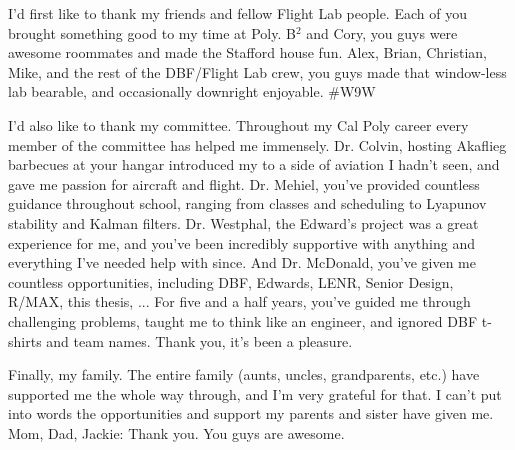I'd first like to thank my friends and fellow Flight Lab people. Each of you brought something good to my time at Poly. B$^2$ and Cory, you guys were awesome roommates and made the Stafford house fun. Alex, Brian, Christian, Mike, and the rest of the DBF/Flight Lab crew, you guys made that window-less lab bearable, and occasionally downright enjoyable. \#W9W

I'd also like to thank my committee. Throughout my Cal Poly career every member of the committee has helped me immensely. Dr. Colvin, hosting Akaflieg barbecues at your hangar introduced my to a side of aviation I hadn't seen, and gave me passion for aircraft and flight. Dr. Mehiel, you've provided countless guidance throughout school, ranging from classes and scheduling to Lyapunov stability and Kalman filters. Dr. Westphal, the Edward's project was a great experience for me, and you've been incredibly supportive with anything and everything I've needed help with since. And Dr. McDonald, you've given me countless opportunities, including DBF, Edwards, LENR, Senior Design, R/MAX, this thesis, ... For five and a half years, you've guided me through challenging problems, taught me to think like an engineer, and ignored DBF t-shirts and team names. Thank you, it's been a pleasure.

Finally, my family. The entire family (aunts, uncles, grandparents, etc.) have supported me the whole way through, and I'm very grateful for that. I can't put into words the opportunities and support my parents and sister have given me. Mom, Dad, Jackie: Thank you. You guys are awesome.